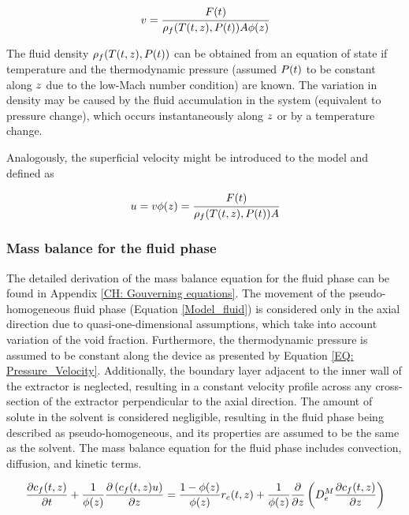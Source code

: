 \documentclass[../Article_Sensitivity_Analsysis.tex]{subfiles}
\begin{document}
	{\footnotesize
	\begin{equation}
		v = \cfrac{{\color{black}F}(t)}{{\color{black}\rho_f}({\color{black}T}(t,z),{\color{black}P}(t)) {\color{black}A\phi}(z)} 
	\end{equation}
	}
	
	The fluid density ${\color{black}\rho_f}({\color{black}T}(t,z),{\color{black}P}(t))$ can be obtained from an equation of state if temperature and the thermodynamic pressure (assumed ${\color{black}P}(t)$ to be constant along ${\color{black}z}$ due to the low-Mach number condition) are known. The variation in density may be caused by the fluid accumulation in the system (equivalent to pressure change), which occurs instantaneously along ${\color{black}z}$ or by a temperature change. 
	
	Analogously, the superficial velocity might be introduced to the model and defined as
	
	{\footnotesize
		\begin{equation}
			u = v {\color{black}\phi}(z) = \cfrac{{\color{black}F}(t)}{{\color{black}\rho_f}({\color{black}T}(t,z),{\color{black}P}(t)) {\color{black} A} }
		\end{equation}
	}
	
	\subsubsection{Mass balance for the fluid phase} \label{CH: Mass_balance_fluid}
	
	The detailed derivation of the mass balance equation for the fluid phase can be found in Appendix \ref{CH: Gouverning equations}. The movement of the pseudo-homogeneous fluid phase (Equation \ref{Model_fluid}) is considered only in the axial direction due to quasi-one-dimensional assumptions, which take into account variation of the void fraction. Furthermore, the thermodynamic pressure is assumed to be constant along the device as presented by Equation \ref{EQ: Pressure_Velocity}. Additionally, the boundary layer adjacent to the inner wall of the extractor is neglected, resulting in a constant velocity profile across any cross-section of the extractor perpendicular to the axial direction. The amount of solute in the solvent is considered negligible, resulting in the fluid phase being described as pseudo-homogeneous, and its properties are assumed to be the same as the solvent. The mass balance equation for the fluid phase includes convection, diffusion, and kinetic terms.
	
	{\footnotesize
		\begin{equation}
			\label{Model_fluid}
			\frac{\partial {\color{black}c_f}(t,z)}{\partial t}
			+ \frac{1}{{\color{black}\phi}(z)} \frac{\partial \left( {\color{black}c_f}(t,z) u\right)}{\partial {\color{black}z}}
			= \frac{1-{\color{black}\phi}(z)}{{\color{black}\phi}(z)} {\color{black}r_e}(t,z)
			+ \frac{1}{{\color{black}\phi}(z)} \frac{\partial}{\partial {\color{black}z}} \left( {\color{black}D^M_e} \frac{\partial {\color{black}c_f}(t,z)}{\partial {\color{black}z}} \right)
		\end{equation}
	}
	
\end{document}
